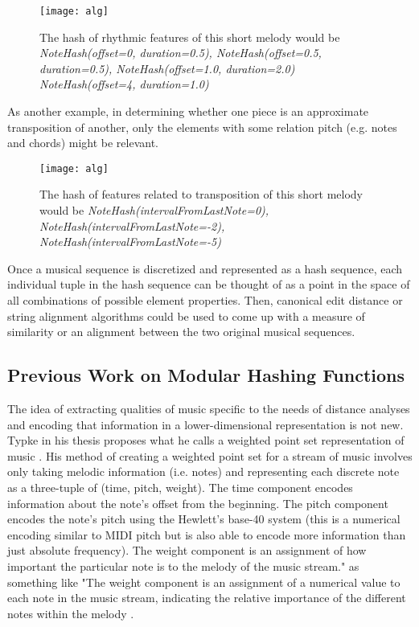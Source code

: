 \begin{figure}[H]
\centering
\texttt{[image: alg]}
\caption[Rhythmic hash of a short melody]{
The hash of rhythmic features of this short melody would be \textit{NoteHash(offset=0, duration=0.5), NoteHash(offset=0.5, duration=0.5), NoteHash(offset=1.0, duration=2.0) NoteHash(offset=4, duration=1.0)}}
\end{figure}

As another example, in determining whether one piece is an approximate transposition of another, only the elements with some relation pitch (e.g. notes and chords) might be relevant.

\begin{figure}[H]
\centering
\texttt{[image: alg]}
\caption[Melody transposition hash]{The hash of features related to transposition of this short melody would be \textit{NoteHash(intervalFromLastNote=0), NoteHash(intervalFromLastNote=-2), NoteHash(intervalFromLastNote=-5)}}
\end{figure}
Once a musical sequence is discretized and represented as a hash sequence, each individual tuple in the hash sequence can be thought of as a point in the space of all combinations of possible element properties. Then, canonical edit distance or string alignment algorithms could be used to come up with a measure of similarity or an alignment between the two original musical sequences.

\subsection{Previous Work on Modular Hashing Functions}
The idea of extracting qualities of music specific to the needs of distance analyses and encoding that information in a lower-dimensional representation is not new. Typke in his thesis proposes what he calls a weighted point set representation of music \cite{typke}. His method of creating a weighted point set for a stream of music involves only taking melodic information (i.e. notes) and representing each discrete note as a three-tuple of (time, pitch, weight). The time component encodes information about the note's offset from the beginning. The pitch component encodes the note's pitch using the Hewlett's base-40 system (this is a numerical encoding similar to MIDI pitch but is also able to encode more information than just absolute frequency). The weight component is an assignment of how important the particular note is to the melody of the music stream." as something like "The weight component is an assignment of a numerical value to each note in the music stream, indicating the relative importance of the different notes within the melody \cite{hewlett}. 


